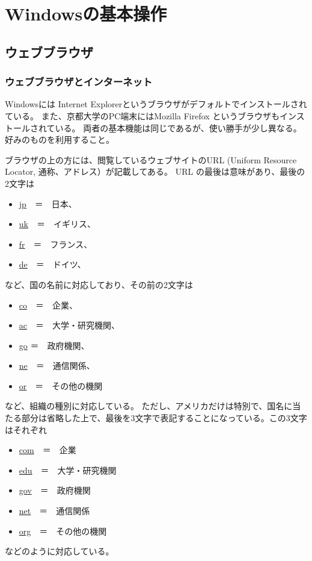 \chapter{Windowsの基本操作}

\section{ウェブブラウザ}
\subsection{ウェブブラウザとインターネット}
Windowsには Internet Explorerというブラウザがデフォルトでインストールされている。
また、京都大学のPC端末にはMozilla Firefox というブラウザもインストールされている。
両者の基本機能は同じであるが、使い勝手が少し異なる。好みのものを利用すること。

ブラウザの上の方には、閲覧しているウェブサイトのURL (Uniform Resource Locator, 通称、アドレス）が記載してある。
URL の最後は意味があり、最後の2文字は
\begin{itemize}
\item \url{jp}　＝　日本、
\item \url{uk}　＝　イギリス、
\item \url{fr}　＝　フランス、
\item \url{de}　＝　ドイツ、
\end{itemize}
など、国の名前に対応しており、その前の2文字は
\begin{itemize}
\item \url{co}　＝　企業、
\item \url{ac}　＝　大学・研究機関、
\item \url{go} ＝　政府機関、
\item \url{ne}　＝　通信関係、
\item \url{or}　＝　その他の機関
\end{itemize}
など、組織の種別に対応している。
ただし、アメリカだけは特別で、国名に当たる部分は省略した上で、最後を3文字で表記することになっている。この3文字はそれぞれ
\begin{itemize}
\item \url{com}　＝　企業
\item \url{edu}　＝　大学・研究機関
\item \url{gov}　＝　政府機関
\item \url{net}　＝　通信関係
\item \url{org}　＝　その他の機関
\end{itemize}
などのように対応している。

